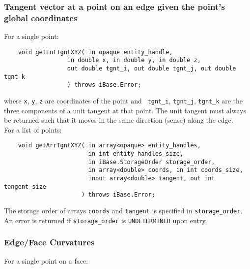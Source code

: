 \documentclass{article}
\begin{document}
\subsubsection{Tangent vector at a point on an edge given 
the point's global coordinates}
For a single point:

\begin{verbatim}
    void getEntTgntXYZ( in opaque entity_handle, 
                  in double x, in double y, in double z,
                  out double tgnt_i, out double tgnt_j, out double tgnt_k
                  ) throws iBase.Error;
\end{verbatim}
where {\tt x}, {\tt y}, {\tt z} are coordinates of the point and {\tt
  tgnt\_i}, {\tt tgnt\_j},
{\tt tgnt\_k} are the three components of a unit tangent at that point. The unit tangent 
must always be returned such that it moves in the same direction 
(sense) along the edge. \\

\hspace{-16pt}For a list of points:

\begin{verbatim}
    void getArrTgntXYZ( in array<opaque> entity_handles, 
                        in int entity_handles_size,
                        in iBase.StorageOrder storage_order,
                        in array<double> coords, in int coords_size,
                        inout array<double> tangent, out int tangent_size
                      ) throws iBase.Error;
\end{verbatim}
The storage order of arrays {\tt coords} and {\tt tangent} is specified in
{\tt storage\_order}. An error is returned if {\tt storage\_order}
 is {\tt UNDETERMINED} upon entry.
 
\subsubsection{Edge/Face Curvatures}
For a single point on a face:
\end{document}
